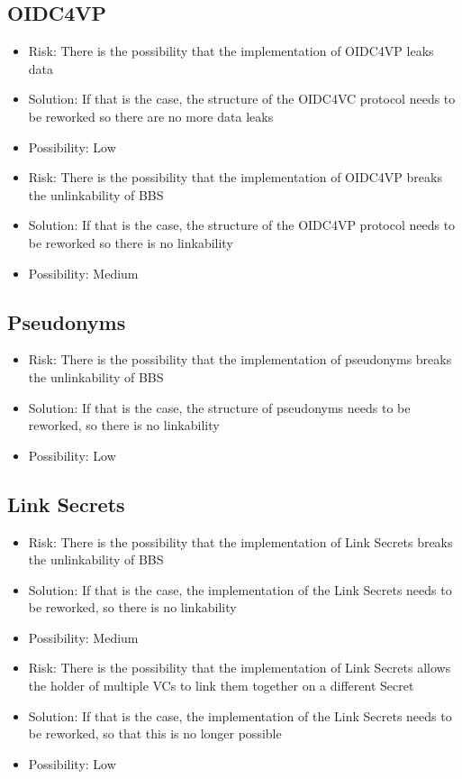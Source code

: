 \documentclass[
	a4paper               %
	,BCOR=0mm            %
	,bibliography=totoc   %
	,listof=totoc         %
	,monolingual
	,twoside=false
]{bfhthesis}              %
\begin{document}
\subsection{OIDC4VP}
\begin{itemize}
	\item Risk: There is the possibility that the implementation of OIDC4VP leaks data
	\item Solution: If that is the case, the structure of the OIDC4VC protocol needs to be reworked so there are no more data leaks
	\item Possibility: Low
\end{itemize}
\begin{itemize}
	\item Risk: There is the possibility that the implementation of OIDC4VP breaks the unlinkability of BBS
	\item Solution: If that is the case, the structure of the OIDC4VP protocol needs to be reworked so there is no linkability
	\item Possibility: Medium
\end{itemize}

\subsection{Pseudonyms}
\begin{itemize}
	\item Risk: There is the possibility that the implementation of pseudonyms breaks the unlinkability of BBS
	\item Solution: If that is the case, the structure of pseudonyms needs to be reworked, so there is no linkability
	\item Possibility: Low
\end{itemize}

\subsection{Link Secrets}
\begin{itemize}
	\item Risk: There is the possibility that the implementation of Link Secrets breaks the unlinkability of BBS
	\item Solution: If that is the case, the implementation of the Link Secrets needs to be reworked, so there is no linkability
	\item Possibility: Medium
\end{itemize}
\begin{itemize}
	\item Risk: There is the possibility that the implementation of Link Secrets allows the holder of multiple VCs to link them together on a different Secret
	\item Solution: If that is the case, the implementation of the Link Secrets needs to be reworked, so that this is no longer possible
	\item Possibility: Low
\end{itemize}
\end{document}
